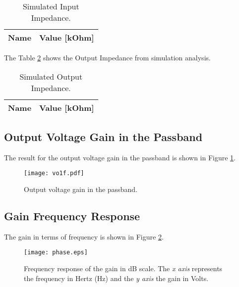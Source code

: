 \begin{table}[H]
	\centering
	\begin{tabular}{|l|r|}
		\hline    
		{\bf Name} & {\bf Value [kOhm]} \\ \hline
		
	\end{tabular}
	\caption{Simulated Input Impedance.}
	\label{tab:sim_zin}
\end{table}

The Table \ref{tab:sim_zout} shows the Output Impedance from simulation analysis.

\begin{table}[H]
	\centering
	\begin{tabular}{|l|r|}
		\hline    
		{\bf Name} & {\bf Value [kOhm]} \\ \hline
		
	\end{tabular}
	\caption{Simulated Output Impedance.}
	\label{tab:sim_zout}
\end{table}


\subsection{Output Voltage Gain in the Passband}
The result for the output voltage gain in the passband is shown in Figure \ref{fig:gain_sim}.

\begin{figure}[H] \centering
	\texttt{[image: vo1f.pdf]}
	\caption{Output voltage gain in the passband.}
	\label{fig:gain_sim}
\end{figure}

\pagebreak

\subsection{Gain Frequency Response}

The gain in terms of frequency is shown in Figure \ref{fig:teo_gaindB}.


\begin{figure}[H] \centering
	\texttt{[image: phase.eps]}
	\caption {Frequency response of the gain in dB scale. The \textit{x axis} represents the frequency in Hertz (Hz) and the \textit{y axis} the gain in Volts.}
	\label{fig:teo_gaindB}
\end{figure}





